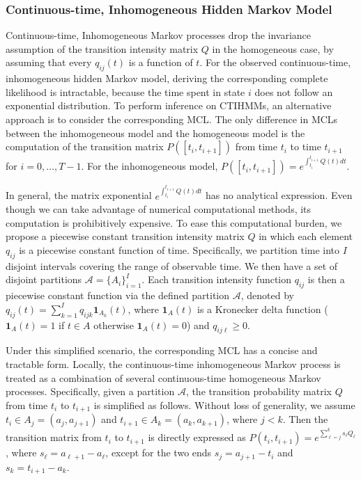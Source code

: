 \documentclass{article}
\begin{document}
\subsubsection{Continuous-time, Inhomogeneous Hidden Markov Model} 

Continuous-time, Inhomogeneous Markov processes drop the invariance assumption of the transition intensity matrix $Q$ in the homogeneous case, by assuming that every $q_{ij}(t)$ is a function of $t$. For the observed continuous-time, inhomogeneous hidden Markov model, deriving the corresponding complete likelihood is intractable, because the time spent in state $i$ does not follow an exponential distribution. To perform inference on CTIHMMs, an alternative approach is to consider the corresponding MCL. The only difference in MCLs between the inhomogeneous model and the homogeneous model is the computation of the transition matrix $P([t_i, t_{i+1}])$ from time $t_i$ to time $t_{i+1}$ for $i = 0, \ldots, T - 1$. For the inhomogeneous model, $P([t_i, t_{i+1}]) = e^{\int _{t_i}^{t_{i+1}}Q(t)dt}$.

In general, the matrix exponential $e^{\int _{t_i}^{t_{i+1}}Q(t)dt}$ has no analytical expression. Even though we can take advantage of numerical computational methods, its computation is prohibitively expensive. To ease this computational burden, we propose a piecewise constant transition intensity matrix $Q$ in which each element $q_{ij}$ is a piecewise constant function of time. Specifically, we  partition time into $I$ disjoint intervals covering the range of observable time.  We then have a set of disjoint partitions $\mathcal{A} = \{ A_i\}_{i=1}^{I}$. Each transition intensity function $q_{ij}$ is then a piecewise constant function via the defined partition $\mathcal{A}$, denoted by $q_{ij}(t) = \sum_{k = 1}^{I}q_{ijk} \bm 1_{A_k}(t)$, where $\bm 1_{A}(t)$ is a Kronecker delta function ($\bm 1_{A}(t) = 1$ if $t \in A$ otherwise $\bm 1_{A}(t) = 0$) and $q_{ij\ell} \geq 0$. 

Under this simplified scenario, the corresponding MCL has a concise and tractable form. Locally, the continuous-time inhomogeneous Markov process is treated as a combination of several continuous-time homogeneous Markov processes. Specifically, given a partition $\mathcal{A}$, the transition probability matrix $Q$ from time $t_i$ to $t_{i+1}$ is simplified as follows. Without loss of generality, we assume $t_i \in A_{j} = (a_{j}, a_{j+1})$ and $t_{i+1} \in A_{k} = (a_{k}, a_{k+1})$, where $j<k$. Then the transition matrix from $t_i$ to $t_{i+1}$ is directly expressed as $P(t_i, t_{i+1}) = e^{\sum_{\ell = j}^{k} s_\ell Q_\ell }$, where $s_\ell = a_{\ell+1} - a_\ell$, except for the two ends $s_j = a_{j+1}- t_i$ and $s_k = t_{i+1} - a_k$.
\end{document}
